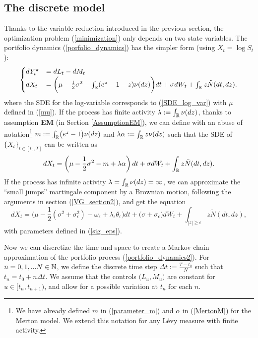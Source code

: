 \subsection{The discrete model}\label{discrete_model}

Thanks to the variable reduction introduced in the previous section, the optimization problem (\ref{minimization}) only depends on two state variables. 
The portfolio dynamics (\ref{porfolio_dynamics}) has the simpler form (using $X_t = \log S_t$):
\begin{equation}\label{portfolio_dynamics2}
 \begin{cases}
 dY^{\pi}_t &=  dL_t - dM_t \\
 dX_t &= \biggl( \mu - \frac{1}{2} \sigma^2 - \int_{\mathbb{R}} (e^z-1-z) \nu(dz) \biggr) dt + \sigma dW_t + \int_{\mathbb{R}} z \tilde N (dt,dz).
\end{cases}
\end{equation} 
where the SDE for the log-variable corresponds to (\ref{SDE_log_var}) with $\mu$ defined in (\ref{mu}).
If the process has finite activity $\lambda := \int_{\mathbb{R}} \nu(dz)$, thanks to assumption \textbf{EM} (in Section \ref{AssumptionEM}),
we can define with an abuse of notation\footnote{We have already defined $m$ in (\ref{parameter_m}) and $\alpha$ in (\ref{MertonM}) for the Merton model. 
We extend this notation for any Lévy measure with finite activity.}
$m := \int_{\mathbb{R}} \bigl( e^z -1 \bigr) \nu(dz)$ and $\lambda \alpha := \int_{\mathbb{R}} z \nu(dz)$ such that the SDE of $\{X_t\}_{t \in [t_0,T]}$ can be written as 
\begin{equation}\label{log_sde_fin_act2} 
 dX_t = \biggl( \mu - \frac{1}{2}\sigma^2 -m + \lambda \alpha \biggr) \,dt + \sigma dW_t + \int_{\mathbb{R}} z \tilde N(dt,dz). \\
\end{equation}
If the process has infinite activity $\lambda = \int_{\mathbb{R}} \nu(dz) = \infty$, 
we can approximate the ``small jumps'' martingale component by a Brownian motion, following the arguments in section (\ref{VG_section2}), and get the equation 
\begin{equation}\label{log_sde_inf_act2}
   dX_t = \biggl( \mu - \frac{1}{2} (\sigma^2 + \sigma_{\epsilon}^2) - \omega_{\epsilon} + \lambda_{\epsilon} \theta_{\epsilon}  \biggr) dt + \bigl( \sigma+\sigma_{\epsilon}\bigr) dW_t 
       + \int_{|z|\geq \epsilon} z \tilde N(dt,dz), 
\end{equation}
with parameters defined in (\ref{sig_eps}).

Now we can discretize the time and space to create a Markov chain approximation of the portfolio process (\ref{portfolio_dynamics2}).
For $n = 0,1, ... N \in \mathbb{N}$, we define the discrete time step $ \Delta t := \frac{T - t_0}{N} $ such that
$t_n = t_0 + n \Delta t$.
We assume that the controls $\bigl(L_u,M_u\bigr)$ are constant for $u \in [t_n,t_{n+1})$, and allow for a possible variation at $t_n$ for each $n$.


